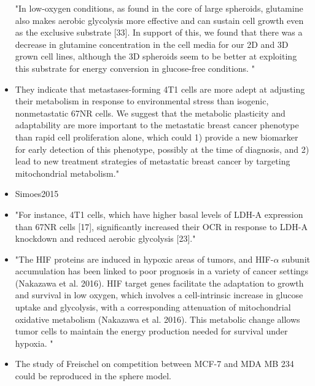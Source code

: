 \documentclass[11pt,a4paper]{article}
\begin{document}
\begin{itemize}
"In low-oxygen conditions, as found in the core of large spheroids, glutamine also makes aerobic glycolysis more effective and can sustain cell growth even as the exclusive substrate [33]. In support of this, we found that there was a decrease in glutamine concentration in the cell media for our 2D and 3D grown cell lines, although the 3D spheroids seem to be better at exploiting this substrate for energy conversion in glucose-free conditions. "\cite{Tidwell2022}

\item They indicate that metastases-forming 4T1 cells are
more adept at adjusting their metabolism in response to environmental stress than isogenic, nonmetastatic 67NR cells. We suggest that the metabolic plasticity and adaptability are more important to the metastatic breast cancer phenotype than rapid
cell proliferation alone, which could 1) provide a new biomarker for early detection of this phenotype, possibly at the time of
diagnosis, and 2) lead to new treatment strategies of metastatic breast cancer by targeting mitochondrial metabolism." \item{Simoes2015}

\item "For instance, 4T1 cells, which have higher basal levels of LDH-A
expression than 67NR cells [17], significantly increased their OCR in
response to LDH-A knockdown and reduced aerobic glycolysis [23]." \cite{Simoes2015}

\item "The HIF proteins are induced in hypoxic areas of tumors, and HIF-$\alpha$ subunit accumulation has been linked to poor prognosis in a variety of cancer settings (Nakazawa et al. 2016). HIF target genes facilitate the adaptation to growth and survival in low oxygen, which involves a cell-intrinsic increase in glucose uptake and glycolysis, with a corresponding attenuation of mitochondrial oxidative metabolism (Nakazawa et al. 2016). This metabolic change allows tumor cells to maintain the energy production needed for survival under hypoxia. "\cite{Torrence2018}

\item The study of Freischel on competition between MCF-7 and MDA MB 234 could be reproduced in the sphere model. \cite{Freischel2021}
\end{itemize}
\end{document}
